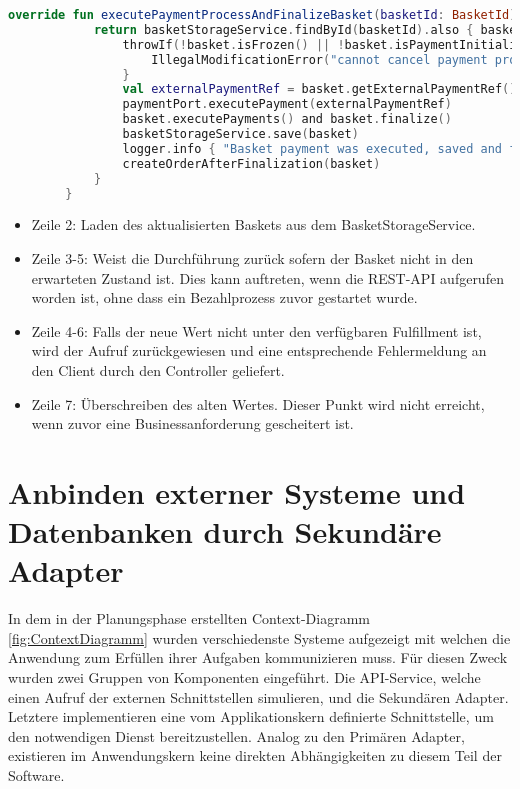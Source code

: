 \begin{minipage}{\linewidth} %
	\begin{lstlisting}[caption={Setzen der Fulfillment Methode im Basket Aggregate}, label={lst:domainservice}, language=Kotlin]
		override fun executePaymentProcessAndFinalizeBasket(basketId: BasketId): Basket {
			return basketStorageService.findById(basketId).also { basket ->
				throwIf(!basket.isFrozen() || !basket.isPaymentInitialized()) {
					IllegalModificationError("cannot cancel payment progress if it is not initialized")
				}
				val externalPaymentRef = basket.getExternalPaymentRef()
				paymentPort.executePayment(externalPaymentRef)
				basket.executePayments() and basket.finalize()
				basketStorageService.save(basket)
				logger.info { "Basket payment was executed, saved and finalized" }
				createOrderAfterFinalization(basket)
			}
		}
	\end{lstlisting}
\end{minipage}

\begin{itemize}[noitemsep,nolistsep]
	\item Zeile 2: Laden des aktualisierten Baskets aus dem BasketStorageService.
	\item Zeile 3-5: Weist die Durchführung zurück sofern der Basket nicht in den erwarteten Zustand ist. Dies kann auftreten, wenn die REST-API aufgerufen worden ist, ohne dass ein Bezahlprozess zuvor gestartet wurde.
	\item Zeile 4-6: Falls der neue Wert nicht unter den verfügbaren Fulfillment ist, wird der Aufruf zurückgewiesen und eine entsprechende Fehlermeldung an den Client durch den Controller geliefert.
	\item Zeile 7: Überschreiben des alten Wertes. Dieser Punkt wird nicht erreicht, wenn zuvor eine Businessanforderung gescheitert ist.
\end{itemize}

\section{Anbinden externer Systeme und Datenbanken durch Sekundäre Adapter}

In dem in der Planungsphase erstellten Context-Diagramm \ref{fig:ContextDiagramm} wurden verschiedenste Systeme aufgezeigt mit welchen die Anwendung zum Erfüllen ihrer Aufgaben kommunizieren muss. Für diesen Zweck wurden zwei Gruppen von Komponenten eingeführt. Die API-Service, welche einen Aufruf der externen Schnittstellen simulieren, und die Sekundären Adapter. Letztere implementieren eine vom Applikationskern definierte Schnittstelle, um den notwendigen Dienst bereitzustellen. Analog zu den Primären Adapter, existieren im Anwendungskern keine direkten Abhängigkeiten zu diesem Teil der Software.

